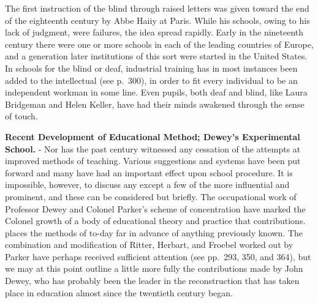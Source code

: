 \documentclass[]{book}
\begin{document}
The first instruction of the blind through raised letters was given toward the end of the eighteenth century by Abbe Haiiy at Paris. While his schools, owing to his lack of judgment, were failures, the idea spread rapidly. Early in the nineteenth century there were one or more schools in each of the leading countries of Europe, and a generation later institutions of this sort were started in the United States. In schools for the blind or deaf, industrial training has in most instances been added to the intellectual (see p.~300), in order to fit every individual to be an independent workman in some line. Even pupils, both deaf and blind, like Laura Bridgeman and Helen Keller, have had their minds awakened through the sense of touch.

\textbf{Recent Development of Educational Method; Dewey's Experimental School.} - Nor has the past century witnessed any cessation of the attempts at improved methods of teaching. Various suggestions and systems have been put forward and many have had an important effect upon school procedure. It is impossible, however, to discuss any except a few of the more influential and prominent, and these can be considered but briefly. The occupational work of Professor Dewey and Colonel Parker's scheme of concentration have marked the Colonel growth of a body of educational theory and practice that contributions. places the methods of to-day far in advance of anything previously known. The combination and modification of Ritter, Herbart, and Froebel worked out by Parker have perhaps received sufficient attention (see pp.~293, 350, and 364), but we may at this point outline a little more fully the contributions made by John Dewey, who has probably been the leader in the reconstruction that has taken place in education almost since the twentieth century began.
\end{document}
